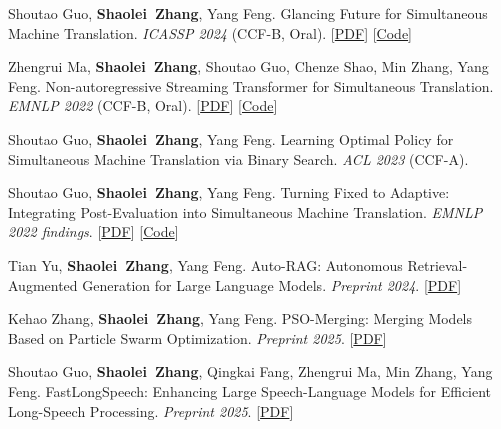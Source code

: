 \documentclass{resume}
\begin{document}
\begin{enumerate}[label={[\arabic*]},parsep=0ex]
    \item Shoutao Guo, \textbf{Shaolei\ Zhang}, Yang Feng. Glancing Future for Simultaneous Machine Translation. \textit{ICASSP 2024} (\textcolor{red2}{CCF-B, Oral}). [\href{https://arxiv.org/pdf/2409.06666}{PDF}] [\href{https://github.com/ictnlp/LLaMA-Omni}{Code}]

    \item Zhengrui Ma, \textbf{Shaolei\ Zhang}, Shoutao Guo, Chenze Shao, Min Zhang, Yang Feng. Non-autoregressive Streaming Transformer for Simultaneous Translation. \textit{EMNLP 2022} (\textcolor{red2}{CCF-B, Oral}). [\href{https://aclanthology.org/2023.emnlp-main.314.pdf}{PDF}] [\href{https://github.com/ictnlp/NAST}{Code}]

    \item Shoutao Guo, \textbf{Shaolei\ Zhang}, Yang Feng. Learning Optimal Policy for Simultaneous Machine Translation via Binary Search. \textit{ACL 2023} (\textcolor{red2}{CCF-A}).
    
    \item Shoutao Guo, \textbf{Shaolei\ Zhang}, Yang Feng. Turning Fixed to Adaptive: Integrating Post-Evaluation into Simultaneous Machine Translation. \textit{EMNLP 2022 findings}. [\href{https://arxiv.org/pdf/2210.11900.pdf}{PDF}] [\href{https://github.com/ictnlp/PED-SiMT}{Code}]
    

    \item Tian Yu, \textbf{Shaolei\ Zhang}, Yang Feng. Auto-RAG: Autonomous Retrieval-Augmented Generation for Large Language Models. \textit{Preprint 2024}. [\href{https://arxiv.org/pdf/2411.19443}{PDF}]


    \item Kehao Zhang, \textbf{Shaolei\ Zhang}, Yang Feng. PSO-Merging: Merging Models Based on Particle Swarm Optimization. \textit{Preprint 2025}. [\href{https://arxiv.org/pdf/2508.19839}{PDF}]

    \item Shoutao Guo, \textbf{Shaolei\ Zhang}, Qingkai Fang, Zhengrui Ma, Min Zhang, Yang Feng. FastLongSpeech: Enhancing Large Speech-Language Models for Efficient Long-Speech Processing. \textit{Preprint 2025}. [\href{https://arxiv.org/pdf/2507.14815}{PDF}]

    
\end{enumerate}

\end{document}
